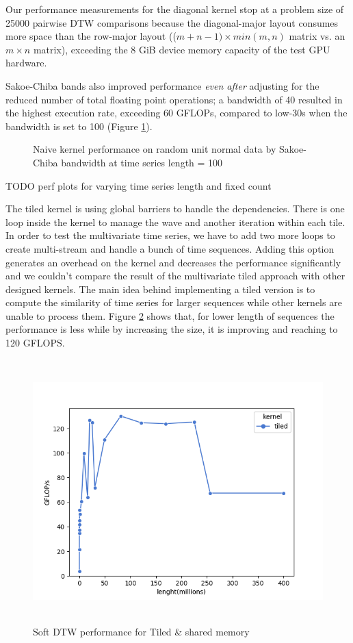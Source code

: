 \documentclass[12pt, letterpaper]{article}
\begin{document}
Our performance measurements for the diagonal kernel stop at a problem size of
25000 pairwise DTW comparisons because the diagonal-major layout consumes more
space than the row-major layout (($m+n-1) \times min(m,n)$ matrix vs. an $m \times n$
matrix), exceeding the 8 GiB device memory capacity of the test GPU hardware.

Sakoe-Chiba bands also improved performance \emph{even after} adjusting for the
reduced number of total floating point operations; a bandwidth of 40 resulted in
the highest execution rate, exceeding 60 GFLOPs, compared to low-30s when the
bandwidth is set to 100 (Figure \ref{plot_bw}).

\begin{figure}[htbp]
    \begin{center}
        \scalebox{0.85}{}
    \end{center}
    \caption{Naive kernel performance on random unit normal data by
      Sakoe-Chiba bandwidth at time series length = 100}
    \label{plot_bw}
\end{figure}

TODO perf plots for varying time series length and fixed count


The tiled kernel is using global barriers to handle the dependencies. 
There is one loop inside the kernel to manage the wave and another iteration within each tile.
In order to test the multivariate time series, we have to add two more loops to create multi-stream and handle a bunch of time sequences. Adding this option generates an overhead on the kernel and decreases the performance significantly and we couldn't compare the result of the multivariate tiled approach with other designed kernels. The main idea behind implementing a tiled version is to compute the similarity of time series for larger sequences while other kernels are unable to process them. Figure \ref{plot_tiled} shows that, for lower length of sequences the performance is less while by increasing the size, it is improving and reaching to 120 GFLOPS.     

\begin{figure}[htbp]
\includegraphics[height=4in]{fig/plot_tiled.png}
\centering
\caption{Soft DTW performance for Tiled & shared memory}
\label{plot_tiled}
\end{figure}
\end{document}
